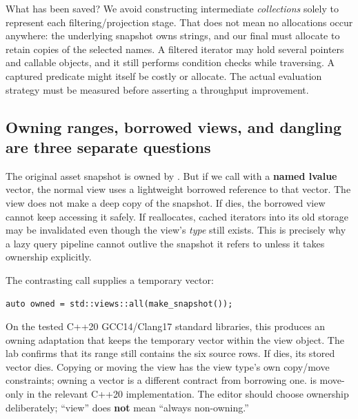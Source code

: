What has been saved? We avoid constructing intermediate \emph{collections} solely to represent each filtering/projection stage. That does not mean no allocations occur anywhere: the underlying snapshot owns strings, and our final  must allocate to retain copies of the selected names. A filtered iterator may hold several pointers and callable objects, and it still performs condition checks while traversing. A captured predicate might itself be costly or allocate. The actual evaluation strategy must be measured before asserting a throughput improvement.

\subsection{Owning ranges, borrowed views, and dangling are three separate questions}\label{05-engine-i-ch006-owning-ranges-borrowed-views-and-dangling-are-three-separate-questions}

\hypertarget{05-engine-i-ch006-owning-ranges-borrowed-views-and-dangling-are-three-separate-questions}{}

The original asset snapshot is owned by . But if we call  with a \textbf{named lvalue} vector, the normal view uses a lightweight borrowed reference to that vector. The view does not make a deep copy of the snapshot. If  dies, the borrowed view cannot keep accessing it safely. If  reallocates, cached iterators into its old storage may be invalidated even though the view's \emph{type} still exists. This is precisely why a lazy query pipeline cannot outlive the snapshot it refers to unless it takes ownership explicitly.

The contrasting call supplies a temporary vector:

\begin{verbatim}
auto owned = std::views::all(make_snapshot());
\end{verbatim}

On the tested C++20 GCC14/Clang17 standard libraries, this produces an owning adaptation that keeps the temporary vector within the view object. The lab confirms that its range still contains the six source rows. If  dies, its stored vector dies. Copying or moving the view has the view type's own copy/move constraints; owning a vector is a different contract from borrowing one.  is move-only in the relevant C++20 implementation. The editor should choose ownership deliberately; ``view'' does \textbf{not} mean ``always non-owning.''

